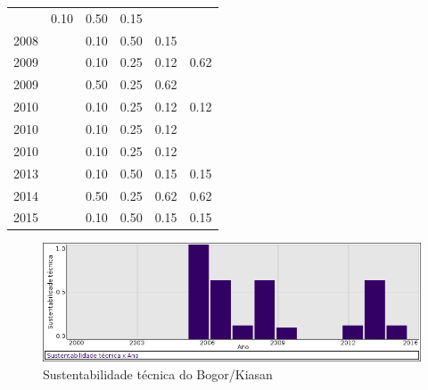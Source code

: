 \begin{table}[H]
\begin{tabular}{| l | c | c | c | c | c |}
          &
          0.10
          &
          0.50
          &
          0.15
          &
          \\
            2008
          &
          
          &
          0.10
          &
          0.50
          &
          0.15
          &
          \\
\hline
            2009
          &
          
          &
          0.10
          &
          0.25
          &
          0.12
          &
            {\color{blue} 0.62}
          \\
            2009
          &
          
          &
          0.50
          &
          0.25
          &
          0.62
          &
          \\
\hline
            2010
          &
          
          &
          0.10
          &
          0.25
          &
          0.12
          &
            {\color{red} 0.12}
          \\
            2010
          &
          
          &
          0.10
          &
          0.25
          &
          0.12
          &
          \\
            2010
          &
          
          &
          0.10
          &
          0.25
          &
          0.12
          &
          \\
\hline
            2013
          &
          
          &
          0.10
          &
          0.50
          &
          0.15
          &
            {\color{red} 0.15}
          \\
\hline
            2014
          &
          
          &
          0.50
          &
          0.25
          &
          0.62
          &
            {\color{blue} 0.62}
          \\
\hline
            2015
          &
          
          &
          0.10
          &
          0.50
          &
          0.15
          &
            {\color{red} 0.15}
          \\
\hline
\end{tabular}
\end{table}

\begin{figure}[h]
  \center
  \includegraphics[scale=0.50]{result-documents/charts/kiasan.png}
  \caption{Sustentabilidade técnica do Bogor/Kiasan}
\end{figure}


